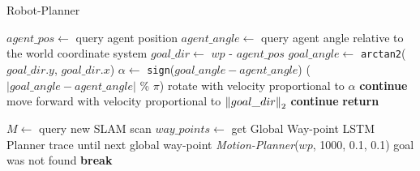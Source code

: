 \begin{algorithm}[h!]
\caption{Robot-Planner}
\label{alg: real_robot}
\begin{algorithmic}[1]

    \For{$i$ in [0, $max\_it$)}
        \State $agent\_pos \gets$ query agent position
        \State $agent\_angle \gets$ query agent angle relative to the world coordinate system
        \State $goal\_dir \gets$ $wp$ - $agent\_pos$
        \State $goal\_angle \gets$ \texttt{arctan2}($goal\_dir.y$, $goal\_dir.x$)
        \State $\alpha \gets$ \texttt{sign}($goal\_angle - agent\_angle$) ($|goal\_angle - agent\_angle|$ \% $\pi$)
        \State
            \State rotate with velocity proportional to $\alpha$
            \State \textbf{continue}
        \EndIf
        \State
            \State move forward with velocity proportional to $\left\lVert goal\_dir\right\rVert_{2}$
            \State \textbf{continue}
        \Else
            \State \textbf{return}
        \EndIf
    \EndFor
    \State
\EndProcedure

        \State $M \gets$ query new SLAM scan
        \State $way\_points \gets$ get Global Way-point LSTM Planner trace until next global way-point
        \State
            \State \textit{Motion-Planner}($wp$, 1000, 0.1, 0.1)
        \EndFor
        \State
            \State goal was not found
            \State \textbf{break}
        \EndIf
    \EndWhile
\EndProcedure
\end{algorithmic}
\end{algorithm}

\pagebreak

